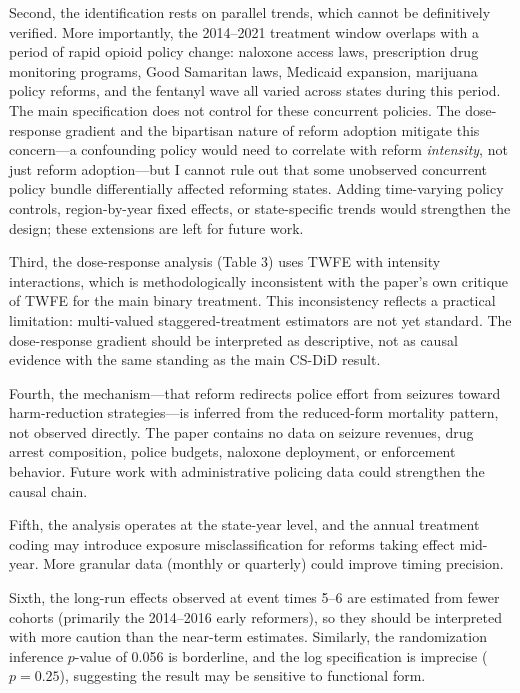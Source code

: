\documentclass[12pt]{article}
\begin{document}
Second, the identification rests on parallel trends, which cannot be definitively verified. More importantly, the 2014--2021 treatment window overlaps with a period of rapid opioid policy change: naloxone access laws, prescription drug monitoring programs, Good Samaritan laws, Medicaid expansion, marijuana policy reforms, and the fentanyl wave all varied across states during this period. The main specification does not control for these concurrent policies. The dose-response gradient and the bipartisan nature of reform adoption mitigate this concern---a confounding policy would need to correlate with reform \emph{intensity}, not just reform adoption---but I cannot rule out that some unobserved concurrent policy bundle differentially affected reforming states. Adding time-varying policy controls, region-by-year fixed effects, or state-specific trends would strengthen the design; these extensions are left for future work.

Third, the dose-response analysis (Table 3) uses TWFE with intensity interactions, which is methodologically inconsistent with the paper's own critique of TWFE for the main binary treatment. This inconsistency reflects a practical limitation: multi-valued staggered-treatment estimators are not yet standard. The dose-response gradient should be interpreted as descriptive, not as causal evidence with the same standing as the main CS-DiD result.

Fourth, the mechanism---that reform redirects police effort from seizures toward harm-reduction strategies---is inferred from the reduced-form mortality pattern, not observed directly. The paper contains no data on seizure revenues, drug arrest composition, police budgets, naloxone deployment, or enforcement behavior. Future work with administrative policing data could strengthen the causal chain.

Fifth, the analysis operates at the state-year level, and the annual treatment coding may introduce exposure misclassification for reforms taking effect mid-year. More granular data (monthly or quarterly) could improve timing precision.

Sixth, the long-run effects observed at event times 5--6 are estimated from fewer cohorts (primarily the 2014--2016 early reformers), so they should be interpreted with more caution than the near-term estimates. Similarly, the randomization inference $p$-value of 0.056 is borderline, and the log specification is imprecise ($p = 0.25$), suggesting the result may be sensitive to functional form.
\end{document}
